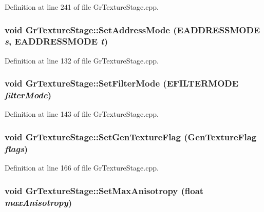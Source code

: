 \begin{CompactItemize}
Definition at line 241 of file GrTextureStage.cpp.\hypertarget{class_gr_texture_stage_bd3af2826c14f1e0bb6b93e9031f4294}{
\subsubsection[{SetAddressMode}]{\setlength{\rightskip}{0pt plus 5cm}void GrTextureStage::SetAddressMode ({\bf EADDRESSMODE} {\em s}, \/  {\bf EADDRESSMODE} {\em t})}}
\label{class_gr_texture_stage_bd3af2826c14f1e0bb6b93e9031f4294}




Definition at line 132 of file GrTextureStage.cpp.\hypertarget{class_gr_texture_stage_f2d25544ef1026d7f705074db5c88902}{
\subsubsection[{SetFilterMode}]{\setlength{\rightskip}{0pt plus 5cm}void GrTextureStage::SetFilterMode ({\bf EFILTERMODE} {\em filterMode})}}
\label{class_gr_texture_stage_f2d25544ef1026d7f705074db5c88902}




Definition at line 143 of file GrTextureStage.cpp.\hypertarget{class_gr_texture_stage_4656b7b3dca1699a7ed25f89c57c190e}{
\subsubsection[{SetGenTextureFlag}]{\setlength{\rightskip}{0pt plus 5cm}void GrTextureStage::SetGenTextureFlag ({\bf GenTextureFlag} {\em flags})}}
\label{class_gr_texture_stage_4656b7b3dca1699a7ed25f89c57c190e}




Definition at line 166 of file GrTextureStage.cpp.\hypertarget{class_gr_texture_stage_fc6ffe941788ef5073fa2c7c80c4644a}{
\subsubsection[{SetMaxAnisotropy}]{\setlength{\rightskip}{0pt plus 5cm}void GrTextureStage::SetMaxAnisotropy (float {\em maxAnisotropy})}}
\label{class_gr_texture_stage_fc6ffe941788ef5073fa2c7c80c4644a}





\end{CompactItemize}
